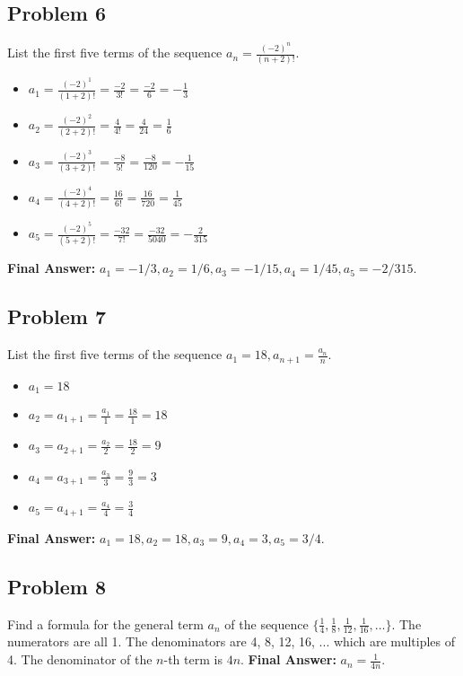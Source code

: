 \documentclass{article}
\begin{document}
\subsection{Problem 6}
List the first five terms of the sequence $a_n = \frac{(-2)^n}{(n+2)!}$.
\begin{itemize}
    \item $a_1 = \frac{(-2)^1}{(1+2)!} = \frac{-2}{3!} = \frac{-2}{6} = -\frac{1}{3}$
    \item $a_2 = \frac{(-2)^2}{(2+2)!} = \frac{4}{4!} = \frac{4}{24} = \frac{1}{6}$
    \item $a_3 = \frac{(-2)^3}{(3+2)!} = \frac{-8}{5!} = \frac{-8}{120} = -\frac{1}{15}$
    \item $a_4 = \frac{(-2)^4}{(4+2)!} = \frac{16}{6!} = \frac{16}{720} = \frac{1}{45}$
    \item $a_5 = \frac{(-2)^5}{(5+2)!} = \frac{-32}{7!} = \frac{-32}{5040} = -\frac{2}{315}$
\end{itemize}
\textbf{Final Answer:} $a_1 = -1/3, a_2 = 1/6, a_3 = -1/15, a_4 = 1/45, a_5 = -2/315$.

\subsection{Problem 7}
List the first five terms of the sequence $a_1 = 18, a_{n+1} = \frac{a_n}{n}$.
\begin{itemize}
    \item $a_1 = 18$
    \item $a_2 = a_{1+1} = \frac{a_1}{1} = \frac{18}{1} = 18$
    \item $a_3 = a_{2+1} = \frac{a_2}{2} = \frac{18}{2} = 9$
    \item $a_4 = a_{3+1} = \frac{a_3}{3} = \frac{9}{3} = 3$
    \item $a_5 = a_{4+1} = \frac{a_4}{4} = \frac{3}{4}$
\end{itemize}
\textbf{Final Answer:} $a_1 = 18, a_2 = 18, a_3 = 9, a_4 = 3, a_5 = 3/4$.

\subsection{Problem 8}
Find a formula for the general term $a_n$ of the sequence $\{\frac{1}{4}, \frac{1}{8}, \frac{1}{12}, \frac{1}{16}, \dots\}$.
The numerators are all 1. The denominators are 4, 8, 12, 16, ... which are multiples of 4.
The denominator of the $n$-th term is $4n$.
\textbf{Final Answer:} $a_n = \frac{1}{4n}$.
\end{document}
